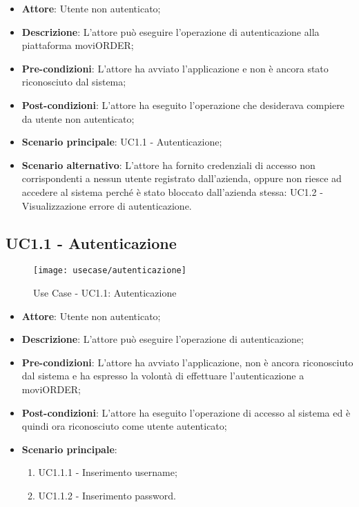 \begin{itemize}
	\item \textbf{Attore}: Utente non autenticato;
	\item \textbf{Descrizione}: L'attore può eseguire l'operazione di autenticazione alla piattaforma moviORDER;
	\item \textbf{Pre-condizioni}: L'attore ha avviato l'applicazione e non è ancora stato riconosciuto dal sistema;
	\item \textbf{Post-condizioni}: L'attore ha eseguito l'operazione che desiderava compiere da utente non autenticato;
	\item \textbf{Scenario principale}: UC1.1 - Autenticazione;
	\item \textbf{Scenario alternativo}: L'attore ha fornito credenziali di accesso non corrispondenti a nessun utente registrato dall'azienda, oppure non riesce ad accedere al sistema perché è stato bloccato dall'azienda stessa: UC1.2 - Visualizzazione errore di autenticazione. 
\end{itemize}

\subsection{UC1.1 - Autenticazione}

\begin{figure}[!h] 
    \centering 
    \texttt{[image: usecase/autenticazione]} 
    \caption{Use Case - UC1.1: Autenticazione}
\end{figure}

\begin{itemize}
	\item \textbf{Attore}: Utente non autenticato;
	\item \textbf{Descrizione}: L'attore può eseguire l'operazione di autenticazione;
	\item \textbf{Pre-condizioni}: L'attore ha avviato l'applicazione, non è ancora riconosciuto dal sistema e ha espresso la volontà di effettuare l’autenticazione a moviORDER;
	\item \textbf{Post-condizioni}: L'attore ha eseguito l'operazione di accesso al sistema ed è quindi ora riconosciuto come utente autenticato;
	\item \textbf{Scenario principale}: 
		\begin{enumerate}
			\item UC1.1.1 - Inserimento username;
			\item UC1.1.2 - Inserimento password.
		\end{enumerate} 
\end{itemize}

